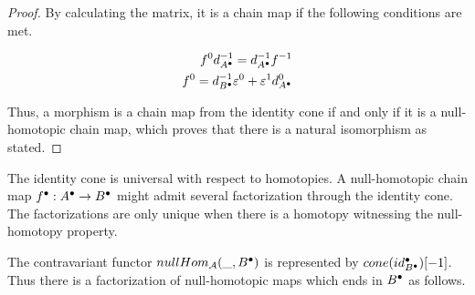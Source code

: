 \begin{proof}
        By calculating the matrix, it is a chain map if the following conditions are met.

        \begin{align*}
            f^0d^{-1}_{A^{\bullet}} = d^{-1}_{A^{\bullet}}f^{-1} \\
            f^0 = d^{-1}_{B^{\bullet}}\varepsilon^0 + \varepsilon^1d^0_{A^{\bullet}}
        \end{align*}

        Thus, a morphism is a chain map from the identity cone if and only if it is a null-homotopic chain map, which proves that there is a natural isomorphism as stated.
    \end{proof}

    \begin{remark}
        The identity cone is universal with respect to homotopies. A null-homotopic chain map $f^{\bullet}:A^{\bullet}\rightarrow B^{\bullet}$ might admit several factorization through the identity cone. The factorizations are only unique when there is a homotopy witnessing the null-homotopy property.
        \begin{center}
        \end{center}
    \end{remark}

    \begin{corollary}
        The contravariant functor $nullHom_{\mathcal{A}}(\_,B^{\bullet})$ is represented by $cone(id_{B^{\bullet}}^{\bullet})[-1]$. Thus there is a factorization of null-homotopic maps which ends in $B^{\bullet}$ as follows.

        \begin{center}
        \end{center}
    \end{corollary}

